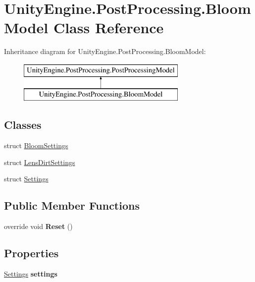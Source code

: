 \hypertarget{class_unity_engine_1_1_post_processing_1_1_bloom_model}{}\section{Unity\+Engine.\+Post\+Processing.\+Bloom\+Model Class Reference}
\label{class_unity_engine_1_1_post_processing_1_1_bloom_model}
Inheritance diagram for Unity\+Engine.\+Post\+Processing.\+Bloom\+Model\+:\begin{figure}[H]
\begin{center}
\leavevmode
\includegraphics[height=2.000000cm]{class_unity_engine_1_1_post_processing_1_1_bloom_model}
\end{center}
\end{figure}
\subsection*{Classes}
\begin{DoxyCompactItemize}
\item 
struct \hyperlink{struct_unity_engine_1_1_post_processing_1_1_bloom_model_1_1_bloom_settings}{Bloom\+Settings}
\item 
struct \hyperlink{struct_unity_engine_1_1_post_processing_1_1_bloom_model_1_1_lens_dirt_settings}{Lens\+Dirt\+Settings}
\item 
struct \hyperlink{struct_unity_engine_1_1_post_processing_1_1_bloom_model_1_1_settings}{Settings}
\end{DoxyCompactItemize}
\subsection*{Public Member Functions}
\begin{DoxyCompactItemize}
\item 
\mbox{\label{class_unity_engine_1_1_post_processing_1_1_bloom_model_afe5c14fd79a06f6ca4c0f96ae056ec07}} 
override void {\bfseries Reset} ()
\end{DoxyCompactItemize}
\subsection*{Properties}
\begin{DoxyCompactItemize}
\item 
\mbox{\label{class_unity_engine_1_1_post_processing_1_1_bloom_model_a58a11bd32da6f48ad47d0d819c6d8730}} 
\hyperlink{struct_unity_engine_1_1_post_processing_1_1_bloom_model_1_1_settings}{Settings} {\bfseries settings}
\end{DoxyCompactItemize}
